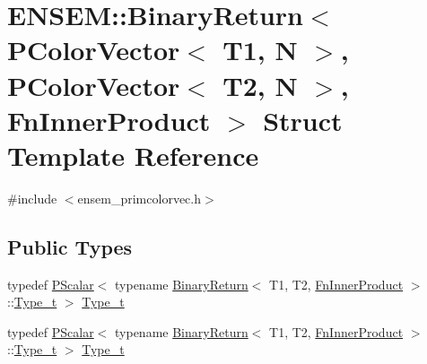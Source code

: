 \hypertarget{structENSEM_1_1BinaryReturn_3_01PColorVector_3_01T1_00_01N_01_4_00_01PColorVector_3_01T2_00_01N_01_4_00_01FnInnerProduct_01_4}{}\section{E\+N\+S\+EM\+:\+:Binary\+Return$<$ P\+Color\+Vector$<$ T1, N $>$, P\+Color\+Vector$<$ T2, N $>$, Fn\+Inner\+Product $>$ Struct Template Reference}
\label{structENSEM_1_1BinaryReturn_3_01PColorVector_3_01T1_00_01N_01_4_00_01PColorVector_3_01T2_00_01N_01_4_00_01FnInnerProduct_01_4}


{\ttfamily \#include $<$ensem\+\_\+primcolorvec.\+h$>$}

\subsection*{Public Types}
\begin{DoxyCompactItemize}
\item 
typedef \mbox{\hyperlink{classENSEM_1_1PScalar}{P\+Scalar}}$<$ typename \mbox{\hyperlink{structENSEM_1_1BinaryReturn}{Binary\+Return}}$<$ T1, T2, \mbox{\hyperlink{structENSEM_1_1FnInnerProduct}{Fn\+Inner\+Product}} $>$\+::\mbox{\hyperlink{structENSEM_1_1BinaryReturn_3_01PColorVector_3_01T1_00_01N_01_4_00_01PColorVector_3_01T2_00_01N_01_4_00_01FnInnerProduct_01_4_aebde22d427d8c8bc7f138930113d34b5}{Type\+\_\+t}} $>$ \mbox{\hyperlink{structENSEM_1_1BinaryReturn_3_01PColorVector_3_01T1_00_01N_01_4_00_01PColorVector_3_01T2_00_01N_01_4_00_01FnInnerProduct_01_4_aebde22d427d8c8bc7f138930113d34b5}{Type\+\_\+t}}
\item 
typedef \mbox{\hyperlink{classENSEM_1_1PScalar}{P\+Scalar}}$<$ typename \mbox{\hyperlink{structENSEM_1_1BinaryReturn}{Binary\+Return}}$<$ T1, T2, \mbox{\hyperlink{structENSEM_1_1FnInnerProduct}{Fn\+Inner\+Product}} $>$\+::\mbox{\hyperlink{structENSEM_1_1BinaryReturn_3_01PColorVector_3_01T1_00_01N_01_4_00_01PColorVector_3_01T2_00_01N_01_4_00_01FnInnerProduct_01_4_aebde22d427d8c8bc7f138930113d34b5}{Type\+\_\+t}} $>$ \mbox{\hyperlink{structENSEM_1_1BinaryReturn_3_01PColorVector_3_01T1_00_01N_01_4_00_01PColorVector_3_01T2_00_01N_01_4_00_01FnInnerProduct_01_4_aebde22d427d8c8bc7f138930113d34b5}{Type\+\_\+t}}
\end{DoxyCompactItemize}


